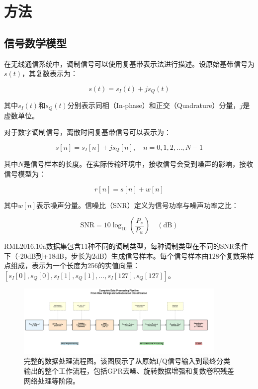 \documentclass{article}
\begin{document}
\section{方法}

\subsection{信号数学模型}

在无线通信系统中，调制信号可以使用复基带表示法进行描述。设原始基带信号为$s(t)$，其复数表示为：

\begin{equation}
s(t) = s_I(t) + js_Q(t)
\end{equation}

其中$s_I(t)$和$s_Q(t)$分别表示同相（In-phase）和正交（Quadrature）分量，$j$是虚数单位。

对于数字调制信号，离散时间复基带信号可以表示为：

\begin{equation}
s[n] = s_I[n] + js_Q[n], \quad n = 0, 1, 2, ..., N-1
\end{equation}

其中$N$是信号样本的长度。在实际传输环境中，接收信号会受到噪声的影响，接收信号模型为：

\begin{equation}
r[n] = s[n] + w[n]
\end{equation}

其中$w[n]$表示噪声分量。信噪比（SNR）定义为信号功率与噪声功率之比：

\begin{equation}
\mathrm{SNR} = 10\log_{10}\left(\frac{P_s}{P_w}\right) \quad(\mathrm{dB})
\end{equation}

RML2016.10a数据集包含11种不同的调制类型，每种调制类型在不同的SNR条件下（-20dB到+18dB，步长为2dB）生成信号样本。每个信号样本由128个复数采样点组成，表示为一个长度为256的实值向量：$[s_I[0], s_Q[0], s_I[1], s_Q[1], ..., s_I[127], s_Q[127]]$。

\begin{figure}[htbp]
\centering
\includegraphics[width=0.9\textwidth]{figure/data_processing_pipeline.png}
\caption{完整的数据处理流程图。该图展示了从原始I/Q信号输入到最终分类输出的整个工作流程，包括GPR去噪、旋转数据增强和复数卷积残差网络处理等阶段。}
\label{fig:data_pipeline}
\end{figure}
\end{document}
